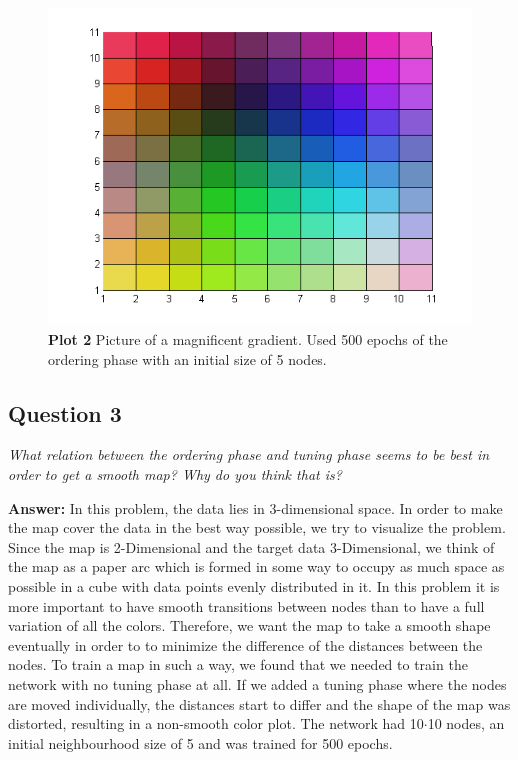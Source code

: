 \documentclass[a4paper]{article}
\begin{document}
\begin{figure}[H] %
	\includegraphics[]{q2_Order500_15init_500epoch.png}
	\caption{\label{fig:plot1P10onP30}\textbf{Plot 2} Picture of a magnificent gradient. Used 500 epochs of the ordering phase with an initial size of 5 nodes.}
\end{figure}

\subsection*{Question 3}
\emph{What relation between the ordering phase and tuning phase seems to be best in order to get a smooth map? Why do you think that is?}

\textbf{Answer:} 
In this problem, the data lies in 3-dimensional space. In order to make the map cover the data in the best way possible, we try to visualize the problem. Since the map is 2-Dimensional and the target data 3-Dimensional, we think of the map as a paper arc which is formed in some way to occupy as much space as possible in a cube with data points evenly distributed in it. In this problem it is more important to have smooth transitions between nodes than to have a full variation of all the colors. Therefore, we want the map to take a smooth shape eventually in order to to minimize the difference of the distances between the nodes. To train a map in such a way, we found that we needed to train the network with no tuning phase at all. If we added a tuning phase where the nodes are moved individually, the distances start to differ and the shape of the map was distorted, resulting in a non-smooth color plot. The network had 10$\cdot$10 nodes, an initial neighbourhood size of 5 and was trained for 500 epochs.
\end{document}
